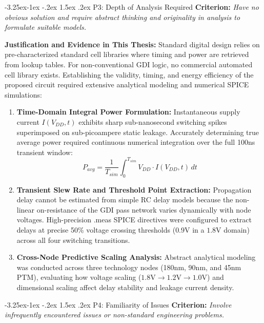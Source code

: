 \documentclass[12pt,a4paper,oneside]{report}
\makeatletter
\renewcommand\subsubsection{\@startsection{subsubsection}{3}{\z@}%
                                     {-3.25ex\@plus -1ex \@minus -.2ex}%
                                     {1.5ex \@plus .2ex}%
                                     {\normalfont\normalsize\itshape}}
\makeatother
\begin{document}
\subsubsection{P3: Depth of Analysis Required}
\textbf{Criterion:} \textit{Have no obvious solution and require abstract thinking and originality in analysis to formulate suitable models.}

\noindent\textbf{Justification and Evidence in This Thesis:}
Standard digital design relies on pre-characterized standard cell libraries where timing and power are retrieved from lookup tables. For non-conventional GDI logic, no commercial automated cell library exists. Establishing the validity, timing, and energy efficiency of the proposed circuit required extensive analytical modeling and numerical SPICE simulations:
\begin{enumerate}
\item \textbf{Time-Domain Integral Power Formulation:} Instantaneous supply current $I(V_{DD}, t)$ exhibits sharp sub-nanosecond switching spikes superimposed on sub-picoampere static leakage. Accurately determining true average power required continuous numerical integration over the full 100ns transient window:
\begin{equation}
P_{avg} = \frac{1}{T_{sim}} \int_0^{T_{sim}} V_{DD} \cdot I(V_{DD}, t) \, dt
\end{equation}
\item \textbf{Transient Slew Rate and Threshold Point Extraction:} Propagation delay cannot be estimated from simple RC delay models because the non-linear on-resistance of the GDI pass network varies dynamically with node voltages. High-precision .meas SPICE directives were configured to extract delays at precise 50\% voltage crossing thresholds ($0.9\text{V}$ in a $1.8\text{V}$ domain) across all four switching transitions.
\item \textbf{Cross-Node Predictive Scaling Analysis:} Abstract analytical modeling was conducted across three technology nodes (180nm, 90nm, and 45nm PTM), evaluating how voltage scaling ($1.8\text{V} \rightarrow 1.2\text{V} \rightarrow 1.0\text{V}$) and dimensional scaling affect delay stability and leakage current density.
\end{enumerate}

\subsubsection{P4: Familiarity of Issues}
\textbf{Criterion:} \textit{Involve infrequently encountered issues or non-standard engineering problems.}
\end{document}

